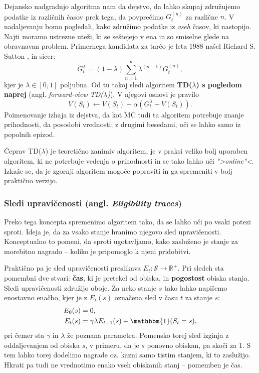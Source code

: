 \documentclass[12pt,a4paper]{amsart}
\theoremstyle{definition} %
\theoremstyle{plain} %
\begin{document}
Dejansko nadgradnjo algoritma nam da dejstvo, da lahko skupaj združujemo podatke iz različnih časov 
prek tega, da povprečimo $G_t^{(n)}$ za različne $n$. V nadaljevanju bomo pogledali, kako združimo 
podatke iz \textit{vseh} časov, ki nastopijo. Najti moramo ustrezne uteži, ki se seštejejo v ena in so 
smiselne glede na obravnavan problem. Primernega kandidata za tarčo je leta $1988$ našel Richard S. 
Sutton \cite{TDlambda}, in sicer:
$$
G_t^\lambda = (1 - \lambda) \sum_{n=1}^\infty \lambda^{(n-1)} G_t^{(n)},
$$
kjer je $\lambda \in [0, 1]$ poljubna. Od tu takoj sledi algoritem \textbf{TD($\lambda$) s pogledom 
naprej} (angl. \textit{forward-view TD($\lambda$)}). V njegovi osnovi je pravilo 
$$
V(S_t) \leftarrow V(S_t) + \alpha (G_t^\lambda - V(S_t)).
$$ 
Poimenovanje izhaja iz dejstva, da kot MC tudi ta algoritem potrebuje znanje prihodnosti, da posodobi 
vrednosti; z drugimi besedami, uči se lahko samo iz popolnih epizod.

Čeprav TD($\lambda$) je teoretično zanimiv algoritem, je v praksi veliko bolj uporaben algoritem, 
ki ne potrebuje vedenja o prihodnosti in se tako lahko uči \textit{">online"<}. Izkaže se, da je 
zgornji algoritem mogoče popraviti in ga spremeniti v bolj praktično verzijo.

\subsubsection{Sledi upravičenosti (angl. \textit{Eligibility traces})}
Preko tega koncepta spremenimo algoritem tako, da se lahko uči po vsaki potezi sproti. Ideja 
je, da za vsako stanje hranimo njegovo sled upravičenosti. Konceptualno to pomeni, da sproti 
ugotavljamo, kako zasluženo je stanje za morebitno nagrado -- koliko je pripomoglo k njeni 
pridobitvi.

Praktično pa je sled upravičenosti preslikava $E_t: \mathcal{S} \rightarrow \mathbb{R}^+$. 
Pri sledeh sta pomembni dve stvari: \textbf{čas}, ki je pretekel od obiska, in \textbf{pogostost} 
obiska stanja. Sledi upravičenosti združijo oboje. Za neko stanje $s$ tako lahko napišemo enostavno 
enačbo, kjer je z $E_t(s)$ označena sled v času $t$ za stanje $s$:
\begin{align*}
    E_0(s) &= 0, \\
    E_t(s) &= \gamma \lambda E_{t-1}(s) + \mathbbm{1}(S_t = s),
\end{align*}
pri čemer sta $\gamma$ in $\lambda$ že poznana parametra. Pomensko torej sled izginja z oddaljevanjem 
od obiska $s$, v primeru, da je $s$ ponovno obiskan, pa skoči za $1$. S tem lahko torej dodelimo 
nagrade oz. kazni samo tistim stanjem, ki to zaslužijo. Hkrati pa tudi ne vrednotimo enako vseh 
obiskanih stanj -- pomemben je čas.
\end{document}
